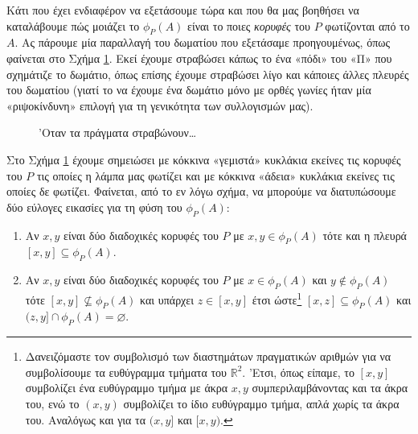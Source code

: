 \documentclass[11pt,a4paper]{article}
\newcommand{\R}{\mathbb{R}}
\theoremstyle{definition}
\begin{document}
	Κάτι που έχει ενδιαφέρον να εξετάσουμε τώρα και που θα μας βοηθήσει να καταλάβουμε πώς μοιάζει το $\phi_P(A)$ είναι το ποιες \textit{κορυφές} του $P$ φωτίζονται από το $A$. Ας πάρουμε μία παραλλαγή του δωματίου που εξετάσαμε προηγουμένως, όπως φαίνεται στο Σχήμα \ref{fig:8}. Εκεί έχουμε στραβώσει κάπως το ένα «πόδι» του «Π» που σχημάτιζε το δωμάτιο, όπως επίσης έχουμε στραβώσει λίγο και κάποιες άλλες πλευρές του δωματίου (γιατί το να έχουμε ένα δωμάτιο μόνο με ορθές γωνίες ήταν μία «ριψοκίνδυνη» επιλογή για τη γενικότητα των συλλογισμών μας).
	
	\begin{figure}[!htb]
		\centering
		\caption{'Οταν τα πράγματα στραβώνουν\ldots}
		\label{fig:8}
	\end{figure}

	Στο Σχήμα \ref{fig:8} έχουμε σημειώσει με κόκκινα «γεμιστά» κυκλάκια εκείνες τις κορυφές του $P$ τις οποίες η λάμπα μας φωτίζει και με κόκκινα «άδεια» κυκλάκια εκείνες τις οποίες δε φωτίζει. Φαίνεται, από το εν λόγω σχήμα, να μπορούμε να διατυπώσουμε δύο εύλογες εικασίες για τη φύση του $\phi_P(A)$:
	\begin{enumerate}
		\item Αν $x,y$ είναι δύο διαδοχικές κορυφές του $P$ με $x,y\in\phi_P(A)$ τότε και η πλευρά $[x,y]\subseteq\phi_P(A)$.
		\item Αν $x,y$ είναι δύο διαδοχικές κορυφές του $P$ με $x\in\phi_P(A)$ και $y\not\in\phi_P(A)$ τότε $[x,y]\not\subseteq\phi_P(A)$ και υπάρχει $z\in[x,y]$ έτσι ώστε\footnote{Δανειζόμαστε τον συμβολισμό των διαστημάτων πραγματικών αριθμών για να συμβολίσουμε τα ευθύγραμμα τμήματα του $\R^2$. 'Ετσι, όπως είπαμε, το $[x,y]$ συμβολίζει ένα ευθύγραμμο τμήμα με άκρα $x,y$ συμπεριλαμβάνοντας και τα άκρα του, ενώ το $(x,y)$ συμβολίζει το ίδιο ευθύγραμμο τμήμα, απλά χωρίς τα άκρα του. Αναλόγως και για τα $(x,y]$ και $[x,y)$.} $[x,z]\subseteq\phi_P(A)$ και $(z,y]\cap\phi_P(A)=\varnothing$.
	\end{enumerate}
\end{document}
